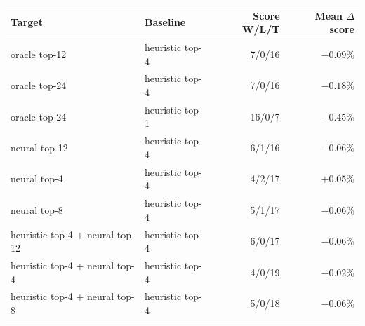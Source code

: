\begin{tabular}{llrr}
\toprule
Target & Baseline & Score W/L/T & Mean $\Delta$ score \\
\midrule
oracle top-12 & heuristic top-4 & 7/0/16 & $-0.09\%$ \\
oracle top-24 & heuristic top-4 & 7/0/16 & $-0.18\%$ \\
oracle top-24 & heuristic top-1 & 16/0/7 & $-0.45\%$ \\
neural top-12 & heuristic top-4 & 6/1/16 & $-0.06\%$ \\
neural top-4 & heuristic top-4 & 4/2/17 & $+0.05\%$ \\
neural top-8 & heuristic top-4 & 5/1/17 & $-0.06\%$ \\
heuristic top-4 + neural top-12 & heuristic top-4 & 6/0/17 & $-0.06\%$ \\
heuristic top-4 + neural top-4 & heuristic top-4 & 4/0/19 & $-0.02\%$ \\
heuristic top-4 + neural top-8 & heuristic top-4 & 5/0/18 & $-0.06\%$ \\
\bottomrule
\end{tabular}
